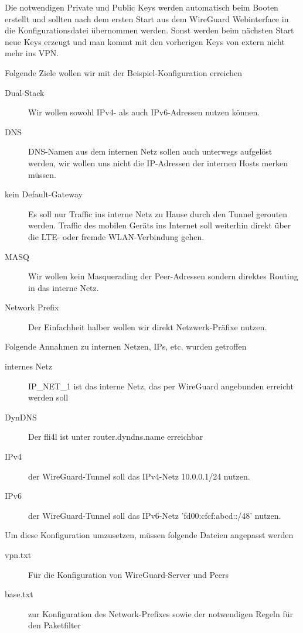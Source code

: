 Die notwendigen Private und Public Keys werden automatisch beim Booten erstellt und sollten nach 
dem ersten Start aus dem WireGuard Webinterface in die Konfigurationsdatei übernommen werden. 
Sonst werden beim nächsten Start neue Keys erzeugt und man kommt mit den vorherigen Keys von 
extern nicht mehr ins VPN.

Folgende Ziele wollen wir mit der Beispiel-Konfiguration erreichen

\begin{description}
    \item[Dual-Stack] Wir wollen sowohl IPv4- als auch IPv6-Adressen nutzen können.
    \item[DNS] DNS-Namen aus dem internen Netz sollen auch unterwegs aufgelöst werden, wir 
    wollen uns nicht die IP-Adressen der internen Hosts merken müssen.
    \item[kein Default-Gateway] Es soll nur Traffic ins interne Netz zu Hause durch den Tunnel 
    gerouten werden. Traffic des mobilen Geräts ins Internet soll weiterhin direkt über die 
    LTE- oder fremde WLAN-Verbindung gehen.
    \item[MASQ] Wir wollen kein Masquerading der Peer-Adressen sondern direktes Routing in das 
    interne Netz.
    \item[Network Prefix] Der Einfachheit halber wollen wir direkt Netzwerk-Präfixe nutzen.
\end{description}


Folgende Annahmen zu internen Netzen, IPs, etc. wurden getroffen

\begin{description}
    \item[internes Netz] IP\_NET\_1 ist das interne Netz, das per WireGuard angebunden erreicht 
    werden soll
    \item[DynDNS] Der fli4l ist unter router.dyndns.name erreichbar
    \item[IPv4] der WireGuard-Tunnel soll das IPv4-Netz 10.0.0.1/24 nutzen.
    \item[IPv6] der WireGuard-Tunnel soll das IPv6-Netz 'fd00:cfcf:abcd::/48' nutzen.
\end{description}


Um diese Konfiguration umzusetzen, müssen folgende Dateien angepasst werden

\begin{description}
    \item[vpn.txt] Für die Konfiguration von WireGuard-Server und Peers
    \item[base.txt] zur Konfiguration des Network-Prefixes sowie der notwendigen Regeln für 
    den Paketfilter
\end{description}


